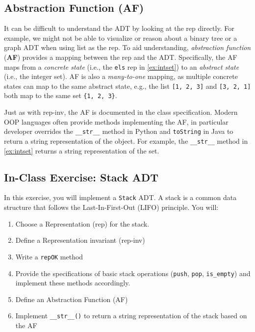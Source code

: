 \documentclass[oneside,11pt,dvipsnames]{book}
\newcommand{\code}[1]{\texttt{#1}}
\begin{document}
\subsection{Abstraction Function (AF)} 

It can be difficult to understand the ADT by looking at the rep directly. For example, we might not be able to visualize or reason about a binary tree or a graph ADT when using list as the rep. To aid understanding, \emph{abstraction function} (\textbf{AF}) provides a mapping between the rep and the ADT. 
Specifically, the AF maps from a \emph{concrete state} (i.e., the \code{els} rep in \autoref{ex:intset}) to an \emph{abstract state} (i.e., the integer set). AF is also a \emph{many-to-one} mapping, as multiple concrete states can map to the same abstract state, e.g., the list \code{[1, 2, 3]} and \code{[3, 2, 1]} both map to the same set \code{\{1, 2, 3\}}. 

Just as with rep-inv, the AF is documented in the class specification. Modern OOP languages often provide methods implementing the AF, in particular developer overrides the \code{\_\_str\_\_} method in Python and \code{toString} in Java to return a string representation of the object. For example, the \code{\_\_str\_\_} method in \autoref{ex:intset} returns a string representation of the set.



\subsection{In-Class Exercise: Stack ADT}

In this exercise, you will implement a \code{Stack} ADT. A stack is a common data structure that follows the Last-In-First-Out (LIFO) principle. You will:
\begin{enumerate}
\item Choose a Representation (rep) for the stack.
\item Define a Representation invariant (rep-inv)
\item Write a \code{repOK} method
\item Provide the specifications of basic stack operations (\code{push}, \code{pop}, \code{is\_empty}) and implement these methods accordingly.
\item Define an Abstraction Function (AF)
\item Implement \code{\_\_str\_\_()} to return a string representation of the stack based on the AF
\end{enumerate}
\end{document}
